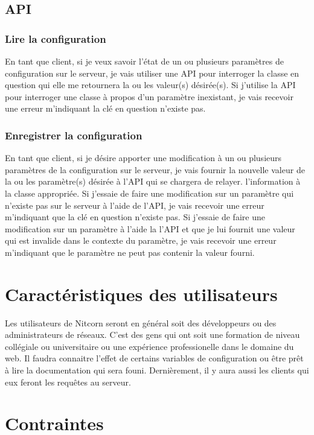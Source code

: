 \documentclass{scrreprt}
\begin{document}
\subsection{API}
\subsubsection{Lire la configuration}
En tant que client, si je veux savoir l'état de un ou plusieurs paramètres de
configuration sur le serveur, je vais utiliser une API pour interroger la 
classe en question qui elle me retournera la ou les valeur(s) désirée(s).
Si j'utilise la API pour interroger une classe à propos d'un paramètre 
inexistant, je vais recevoir une erreur m'indiquant la clé en question
n'existe pas.

\subsubsection{Enregistrer la configuration}
En tant que client, si je désire apporter une modification à un ou plusieurs
paramètres de la configuration sur le serveur, je vais fournir la nouvelle valeur
de la ou les paramètre(s) désirée à l'API qui se chargera de relayer.
l'information à la classe appropriée.
Si j'essaie de faire une modification sur un paramètre qui n'existe pas sur le
serveur à l'aide de l'API, je vais recevoir une erreur m'indiquant que la clé en
question n'existe pas.
Si j'essaie de faire une modification sur un paramètre à l'aide la l'API et que  
je lui fournit une valeur qui est invalide dans le contexte du paramètre, je 
vais recevoir une erreur m'indiquant que le paramètre ne peut pas contenir
la valeur fourni.

\section{Caractéristiques des utilisateurs}
Les utilisateurs de Nitcorn seront en général soit des développeurs ou des
administrateurs de réseaux. C'est des gens qui ont soit une formation de
niveau collégiale ou universitaire ou une expérience professionelle dans
le domaine du web. Il faudra connaitre l'effet de certains variables de
configuration ou être prêt à lire la documentation qui sera founi. 
Dernièrement, il y aura aussi les clients qui eux feront les requêtes
au serveur.

\section{Contraintes}
\end{document}
